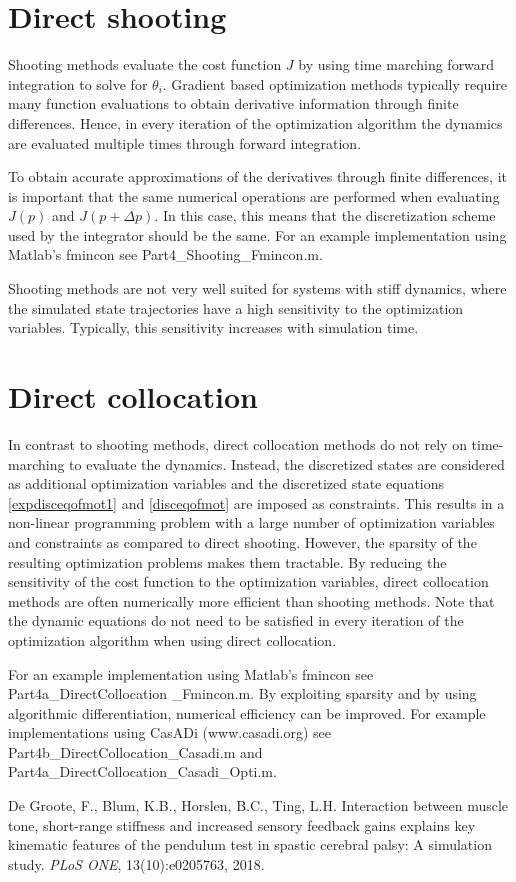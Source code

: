 \documentclass[
a4paper, %
11pt, %
onecolumn, %
openright, %
]{memoir}
\begin{document}
\section{Direct shooting}

Shooting methods evaluate the cost function $J$ by using time marching forward integration to solve for $\theta_i$. Gradient based optimization methods typically require many function evaluations to obtain derivative information through finite differences. Hence, in every iteration of the optimization algorithm the dynamics are evaluated multiple times through forward integration. 

To obtain accurate approximations of the derivatives through finite differences, it is important that the same numerical operations are performed when evaluating $J(p)$ and $J(p+\Delta p)$. In this case, this means that the discretization scheme used by the integrator should be the same. For an example implementation using Matlab's fmincon see Part4\_Shooting\_Fmincon.m.

Shooting methods are not very well suited for systems with stiff dynamics, where the simulated state trajectories have a high sensitivity to the optimization variables. Typically, this sensitivity increases with simulation time.

\section{Direct collocation}

In contrast to shooting methods, direct collocation methods do not rely on time-marching to evaluate the dynamics. Instead, the discretized states are considered as additional optimization variables and the discretized state equations \ref{expdisceqofmot1} and \ref{disceqofmot} are imposed as constraints. This results in a non-linear programming problem with a large number of optimization variables and constraints as compared to direct shooting. However, the sparsity of the resulting optimization problems makes them tractable. By reducing the sensitivity of the cost function to the optimization variables, direct collocation methods are often numerically more efficient than shooting methods. Note that the dynamic equations do not need to be satisfied in every iteration of the optimization algorithm when using direct collocation. 

For an example implementation using Matlab's fmincon see Part4a\_DirectCollocation  \_Fmincon.m. By exploiting sparsity and by using algorithmic differentiation, numerical efficiency can be improved. For example implementations using CasADi (www.casadi.org) see Part4b\_DirectCollocation\_Casadi.m and Part4a\_DirectCollocation\_Casadi\_Opti.m.

\begin{thebibliography}{9}
De Groote, F., Blum, K.B., Horslen, B.C., Ting, L.H. Interaction between muscle tone, short-range stiffness and increased sensory feedback gains explains key kinematic features of the pendulum test in spastic cerebral palsy: A simulation study. 
\textit{PLoS ONE}, 13(10):e0205763, 2018. 

\end{thebibliography}
\end{document}
